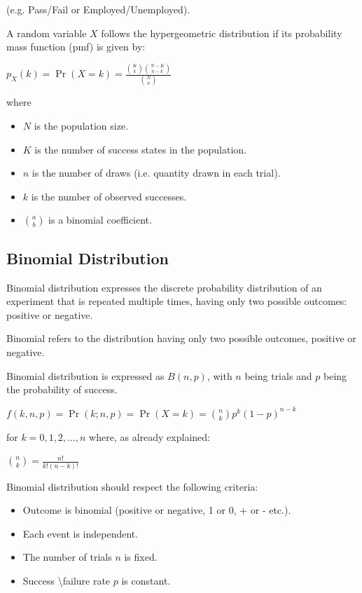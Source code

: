 \documentclass{article}
\begin{document}
 (e.g. Pass/Fail or Employed/Unemployed).

A random variable $X$ follows the hypergeometric distribution if its probability mass function (pmf) is given by:

$ \displaystyle p_{X}(k)=\Pr(X=k)={\frac {{\binom {K}{k}}{\binom {N-K}{n-k}}}{\binom {N}{n}}} $

where
\begin{itemize}
    \item $N$ is the population size.
    \item $K$ is the number of success states in the population.
    \item $n$ is the number of draws (i.e. quantity drawn in each trial).
    \item $k$ is the number of observed successes.
    \item $\genfrac{(}{)}{0pt}{}{a}{b}$ is a binomial coefficient.
\end{itemize}

\subsection{Binomial Distribution}
Binomial distribution expresses the discrete probability distribution of an experiment that is repeated multiple times, having only two possible outcomes: positive or negative. 

Binomial refers to the distribution having only two possible outcomes, positive or negative. 

Binomial distribution is expressed as $B(n,p)$, with $n$ being trials and $p$ being the probability of success. 

$ \displaystyle f(k,n,p)=\Pr(k;n,p)=\Pr(X=k)={\binom {n}{k}}p^{k}(1-p)^{n-k}$

for $k = 0, 1, 2, \ldots, n$ where, as already explained:

$ \displaystyle {\binom {n}{k}}={\frac {n!}{k!(n-k)!}}$

Binomial distribution should respect the following criteria:
\begin{itemize}
    \item Outcome is binomial (positive or negative, 1 or 0, + or - etc.).
    \item Each event is independent.
    \item The number of trials $n$ is fixed.
    \item Success \textbackslash failure rate $p$ is constant.
\end{itemize}
\end{document}
